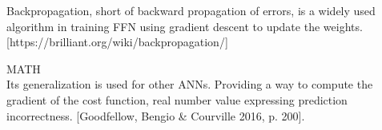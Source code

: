 Backpropagation, short of backward propagation of errors, is a widely used algorithm in training FFN using gradient descent to update the weights. [https://brilliant.org/wiki/backpropagation/]\newline

MATH \\

Its generalization is used for other ANNs. Providing a way to compute the gradient of the cost function, real number value expressing prediction incorrectness.
[Goodfellow, Bengio \& Courville 2016, p. 200].
